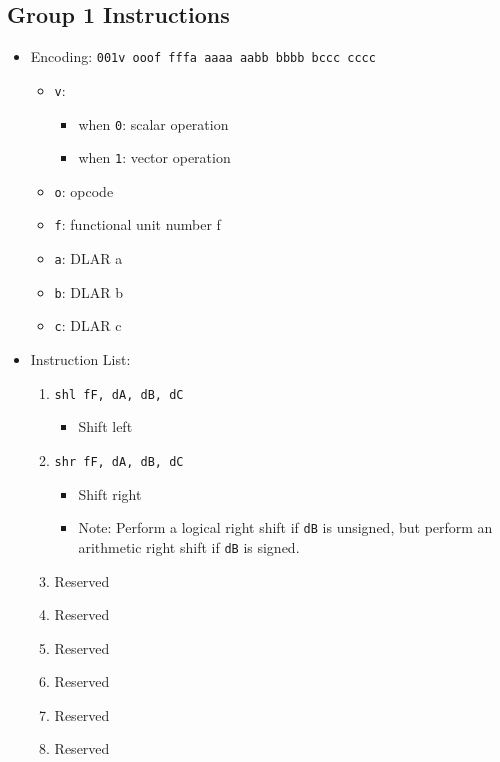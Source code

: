 \documentclass{article}
\begin{document}
	\subsection{Group 1 Instructions}
		\begin{itemize}
		\item Encoding:  \texttt{001v ooof fffa aaaa  aabb bbbb bccc cccc}
			\begin{itemize}
			\item \texttt{v}:
				\begin{itemize}
				\item when \texttt{0}:  scalar operation
				\item when \texttt{1}:  vector operation
				\end{itemize}
			\item \texttt{o}:  opcode
			\item \texttt{f}:  functional unit number f
			\item \texttt{a}:  DLAR a
			\item \texttt{b}:  DLAR b
			\item \texttt{c}:  DLAR c
			\end{itemize}
		\item Instruction List:
			\begin{enumerate}
			\item \texttt{shl fF, dA, dB, dC}
				\begin{itemize}
				\item Shift left
				\end{itemize}
			\item \texttt{shr fF, dA, dB, dC}
				\begin{itemize}
				\item Shift right
				\item Note:  Perform a logical right shift if \texttt{dB}
					is unsigned, but perform an arithmetic right shift if
					\texttt{dB} is signed.
				\end{itemize}
			\item Reserved
			\item Reserved

			\item Reserved
			\item Reserved
			\item Reserved
			\item Reserved
			\end{enumerate}
		\end{itemize}
\end{document}
